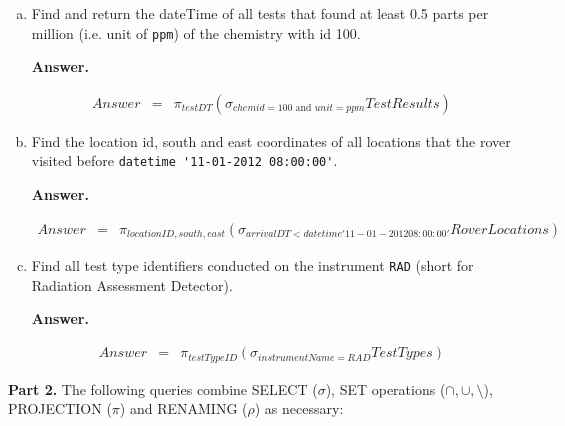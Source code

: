 \documentclass[11pt]{article}
\begin{document}
\begin{enumerate}  [(a)]
\item Find and return the dateTime of all tests that found at least
  0.5 parts per million (i.e. unit of \verb+ppm+) of the chemistry with id
  100.

{\bf Answer.}

\begin{eqnarray*}
Answer & = & \pi_{testDT} (\sigma_{chemid=100 \mbox{ and } unit = ppm} TestResults)
\end{eqnarray*}

\item Find the location id, south and east coordinates of all locations
  that the rover visited before \verb+datetime '11-01-2012 08:00:00'+.


{\bf Answer.}

\begin{eqnarray*}
Answer & = & \pi_{locationID, south, east} (\sigma_{arrivalDT < datetime '11-01-2012 08:00:00'} RoverLocations)
\end{eqnarray*}

\item Find all test type identifiers conducted on the instrument
  \verb+RAD+ (short for Radiation Assessment Detector).

{\bf Answer.}

\begin{eqnarray*}
Answer & = & \pi_{testTypeID} (\sigma_{instrumentName = RAD} TestTypes)
\end{eqnarray*}

\end{enumerate}

{\bf Part 2.} The following queries combine SELECT ($\sigma$), SET
operations ($\cap,\cup,\setminus$), PROJECTION ($\pi$) and RENAMING
($\rho$) as necessary:
\end{document}
